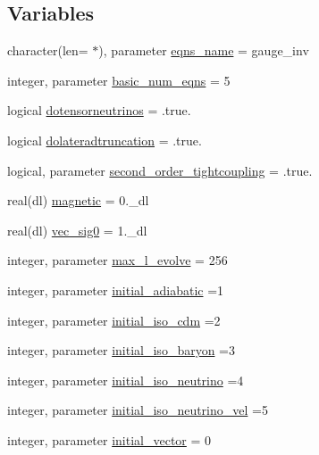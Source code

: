 \subsection*{Variables}
\begin{DoxyCompactItemize}
\item 
character(len= $\ast$), parameter \mbox{\hyperlink{namespacegaugeinterface_a7ad176ccd8e025b00d5ae35428c6f894}{eqns\+\_\+name}} = \textquotesingle{}gauge\+\_\+inv\textquotesingle{}
\item 
integer, parameter \mbox{\hyperlink{namespacegaugeinterface_a4ec8e34555b9492e02f9ca7793b37b7a}{basic\+\_\+num\+\_\+eqns}} = 5
\item 
logical \mbox{\hyperlink{namespacegaugeinterface_a48d8dc2750f4cecf3337b6f6dd2d736b}{dotensorneutrinos}} = .true.
\item 
logical \mbox{\hyperlink{namespacegaugeinterface_a1c86dc449a45192d8e9e999627a3f511}{dolateradtruncation}} = .true.
\item 
logical, parameter \mbox{\hyperlink{namespacegaugeinterface_af060fa6622bea0f389dc0965bee8d67f}{second\+\_\+order\+\_\+tightcoupling}} = .true.
\item 
real(dl) \mbox{\hyperlink{namespacegaugeinterface_aaa26844a2740bc664b3c821e92dc6b52}{magnetic}} = 0.\+\_\+dl
\item 
real(dl) \mbox{\hyperlink{namespacegaugeinterface_ae547cea1b332095dd0c9b5a6c24466ae}{vec\+\_\+sig0}} = 1.\+\_\+dl
\item 
integer, parameter \mbox{\hyperlink{namespacegaugeinterface_a965f8caba9ba282e718281110e274b04}{max\+\_\+l\+\_\+evolve}} = 256
\item 
integer, parameter \mbox{\hyperlink{namespacegaugeinterface_ac5567a8b42e51ba563113652958ea70b}{initial\+\_\+adiabatic}} =1
\item 
integer, parameter \mbox{\hyperlink{namespacegaugeinterface_aab102b09528270be73847e43bc4ea5ab}{initial\+\_\+iso\+\_\+cdm}} =2
\item 
integer, parameter \mbox{\hyperlink{namespacegaugeinterface_aa3aaa16f51217e9cada87f670d1a2ae6}{initial\+\_\+iso\+\_\+baryon}} =3
\item 
integer, parameter \mbox{\hyperlink{namespacegaugeinterface_adbaabf824bb924de7518b623ffd8c9e3}{initial\+\_\+iso\+\_\+neutrino}} =4
\item 
integer, parameter \mbox{\hyperlink{namespacegaugeinterface_a47175df2f7681cf8e8a2a7e2cb94952a}{initial\+\_\+iso\+\_\+neutrino\+\_\+vel}} =5
\item 
integer, parameter \mbox{\hyperlink{namespacegaugeinterface_a540c4e4d2e1dea17aeb55e137acb0218}{initial\+\_\+vector}} = 0

\end{DoxyCompactItemize}
